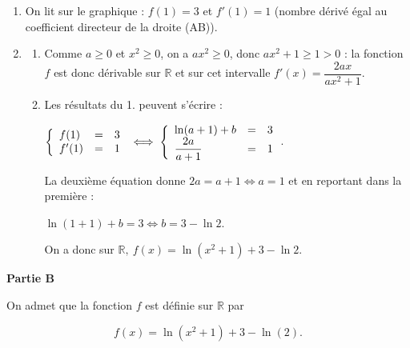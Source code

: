 \documentclass[10pt]{article}
\providecommand{\R}{\mathbb{R}}
\begin{document}
\begin{enumerate}
\item 
On lit sur le graphique : $f(1) = 3$ et $f'(1) = 1$ (nombre dérivé égal au coefficient directeur de la droite (AB)).
\item 
	\begin{enumerate}
		\item 
		Comme $a \geqslant 0$ et $x^2 \geqslant 0$, on a $ax^2 \geqslant 0$, donc $ax^2 + 1 \geqslant 1 > 0$ : la fonction $f$ est donc dérivable sur $\R$ et sur cet intervalle $f'(x) = \dfrac{2ax}{ax^2 + 1}$.
		\item 
		Les résultats du 1. peuvent s'écrire :
		
$\left\{\begin{array}{l c l}
f(1)&=&3\\
f'(1)&=&1
\end{array}\right. \iff \left\{\begin{array}{l c l}
\ln (a + 1) + b&=&3\\
\dfrac{2a}{a + 1}&=&1
\end{array}\right.$.

La deuxième équation donne $2a = a + 1 \iff a = 1$ et en reportant dans la première :

$\ln (1 + 1) + b = 3 \iff b = 3 - \ln 2$.

On a donc sur $\R, \: f(x) = \ln \left(x^2 + 1 \right) + 3 - \ln 2$.

	\end{enumerate}
\end{enumerate} 

\bigskip

\textbf{Partie B}

\medskip

On admet que la fonction $f$ est définie sur $\R$ par

\[f(x) = \ln \left(x^2 + 1\right) + 3 - \ln (2).\]

\medskip
\end{document}
